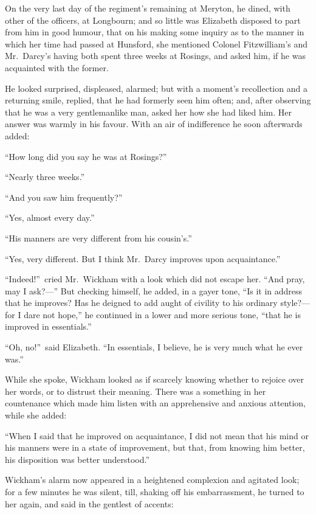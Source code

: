 \documentclass[12pt,english,oneside]{book}
\begin{document}
On the very last day of the regiment's remaining at Meryton, he dined,
with other of the officers, at Longbourn; and so little was Elizabeth
disposed to part from him in good humour, that on his making some
inquiry as to the manner in which her time had passed at Hunsford,
she mentioned Colonel Fitzwilliam's and Mr.\ Darcy's having both
spent three weeks at Rosings, and asked him, if he was acquainted
with the former.

He looked surprised, displeased, alarmed; but with a moment's recollection
and a returning smile, replied, that he had formerly seen him often;
and, after observing that he was a very gentlemanlike man, asked her
how she had liked him. Her answer was warmly in his favour. With an
air of indifference he soon afterwards added:

{}``How long did you say he was at Rosings?''\ 

{}``Nearly three weeks.''

{}``And you saw him frequently?''\ 

{}``Yes, almost every day.''

{}``His manners are very different from his cousin's.''

{}``Yes, very different. But I think Mr.\ Darcy improves upon acquaintance.''

{}``Indeed!''\ cried Mr.\ Wickham with a look which did not escape
her. {}``And pray, may I ask?\mbox{---}'' But checking himself,
he added, in a gayer tone, {}``Is it in address that he improves?
Has he deigned to add aught of civility to his ordinary style?\mbox{---}for
I dare not hope,'' he continued in a lower and more serious tone,
{}``that he is improved in essentials.''

{}``Oh, no!''\ said Elizabeth. {}``In essentials, I believe, he
is very much what he ever was.''

While she spoke, Wickham looked as if scarcely knowing whether to
rejoice over her words, or to distrust their meaning. There was a
something in her countenance which made him listen with an apprehensive
and anxious attention, while she added:

{}``When I said that he improved on acquaintance, I did not mean
that his mind or his manners were in a state of improvement, but that,
from knowing him better, his disposition was better understood.''

Wickham's alarm now appeared in a heightened complexion and agitated
look; for a few minutes he was silent, till, shaking off his embarrassment,
he turned to her again, and said in the gentlest of accents:
\end{document}
